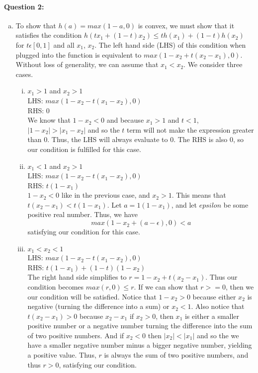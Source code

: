 \documentclass[letterpaper,11pt]{article}
\begin{document}
\paragraph{Question 2:}
\begin{enumerate}[(a)]
\item
To show that $h(a) = max(1 - a, 0)$ is convex, we must show that it satisfies the condition $h(t x_1 + (1-t) x_2) \leq t h(x_1) + (1-t) h(x_2)$ for $t \epsilon [0,1]$ and all $x_1$, $x_2$. The left hand side (LHS) of this condition when plugged into the function is equivalent to $max(1-x_2 + t(x_2 - x_1), 0)$. Without loss of generality, we can assume that $x_1 < x_2$. We consider three cases.
\begin{enumerate}[i)]
\item
$x_1 > 1$ and $x_2 > 1$\\
LHS: $max(1-x_2 - t(x_1 - x_2), 0)$\\
RHS: $0$\\
We know that $1-x_2 < 0$ and
because $x_1 > 1$ and $t < 1$, $|1-x_2| > |x_1 - x_2|$ and so the $t$ term will not make the expression greater than $0$. Thus, the LHS will always evaluate to $0$. The RHS is also $0$, so our condition is fulfilled for this case.
\item
$x_1 < 1$ and $x_2 > 1$\\
LHS: $max(1-x_2 - t(x_1 - x_2), 0)$\\
RHS: $t(1-x_1)$\\
$1-x_2 < 0$ like in the previous case, and $x_2 > 1$. This means that $t(x_2 - x_1) < t(1 - x_1)$. Let $a = 1(1-x_1)$, and let $epsilon$ be some positive real number. Thus, we have
\begin{equation}
max(1 - x_2 + (a - \epsilon), 0) < a
\end{equation}
 satisfying our condition for this case.
\item
$x_1 < x_2 < 1$\\
LHS: $max(1-x_2 - t(x_1 - x_2), 0)$\\
RHS: $t(1-x_1) + (1-t)(1-x_2)$\\
The right hand side simplifies to $r = 1 - x_2 + t(x_2 - x_1)$. Thus our condition becomes $max(r, 0) \leq r$. If we can show that $r >= 0$, then we our condition will be satisfied. Notice that $1 - x_2 > 0$ because either $x_2$ is negative (turning the difference into a sum) or $x_2 < 1$. Also notice that $t(x_2 - x_1) > 0$ because $x_2 - x_1$ if $x_2 > 0$, then $x_1$ is either a smaller positive number or a negative number turning the difference into the sum of two positive numbers. And if $x_2 < 0$ then $|x_2| < |x_1|$ and so the we have a smaller negative number minus a bigger negative number, yielding a positive value. Thus, $r$ is always the sum of two positive numbers, and thus $r > 0$, satisfying our condition.

\end{enumerate}
\end{enumerate}
\end{document}
